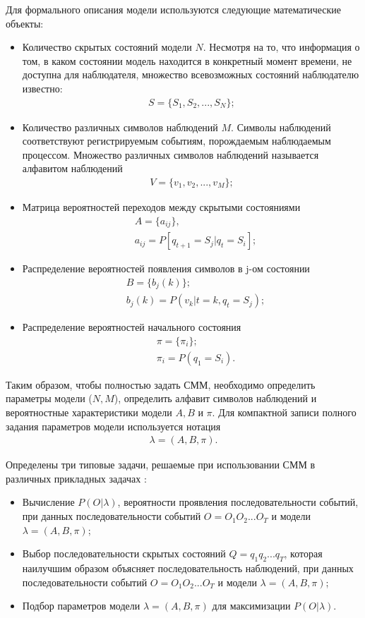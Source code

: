 Для формального описания модели используются следующие математические объекты:
\begin{itemize}
	\item
	Количество скрытых состояний модели \(N\). Несмотря на то, что информация о том, в каком состоянии модель находится в конкретный момент времени, не доступна для наблюдателя, множество всевозможных состояний наблюдателю известно:
	\begin{align} 
		S = \{ S_1, S_2, ..., S_N \};
	\end{align}
	\item
	Количество различных символов наблюдений \(M\). Символы наблюдений соответствуют регистрируемым событиям, порождаемым наблюдаемым процессом. Множество различных символов наблюдений называется алфавитом наблюдений
	\begin{align} 
		V = \{ v_1, v_2, ..., v_M \};
	\end{align}
	\item
	Матрица вероятностей переходов между скрытыми состояниями
	\begin{align} 
		&A = \{ a_{ij} \}, \\
		&a_{ij} = P[q_{t + 1} = S_j | q_t = S_i];
	\end{align}
	\item
	Распределение вероятностей появления символов в j-ом состоянии
	\begin{align}
		&B = \{ b_j(k) \}; \\ 
		&b_j(k) = P(v_k | t = k, q_t = S_j);
	\end{align}
	\item
	Распределение вероятностей начального состояния
	\begin{align}
		&\pi = \{\pi_i\}; \\
		&\pi_i = P(q_1 = S_i). 
	\end{align}
\end{itemize}

Таким образом, чтобы полностью задать СММ, необходимо определить параметры модели (\(N, M\)), определить алфавит символов наблюдений и вероятностные характеристики модели \(A, B\) и \(\pi\). Для компактной записи полного задания параметров модели используется нотация
\begin{align}
	\lambda = (A, B, \pi).
\end{align}

Определены три типовые задачи, решаемые при использовании СММ в различных прикладных задачах \cite{Rabiner89atutorial}:
\begin{itemize}
	\item
	Вычисление \(P(O|\lambda)\), вероятности проявления последовательности событий, при данных последовательности событий \(O=O_1O_2...O_T\) и модели \(\lambda = (A, B, \pi)\);
	\item
	Выбор последовательности скрытых состояний \(Q=q_1q_2...q_T\), которая наилучшим образом объясняет последовательность наблюдений, при данных последовательности событий \(O=O_1O_2...O_T\) и модели \(\lambda = (A, B, \pi)\);
	\item
	Подбор параметров модели \(\lambda = (A, B, \pi)\) для максимизации \(P(O|\lambda)\).
\end{itemize} 

